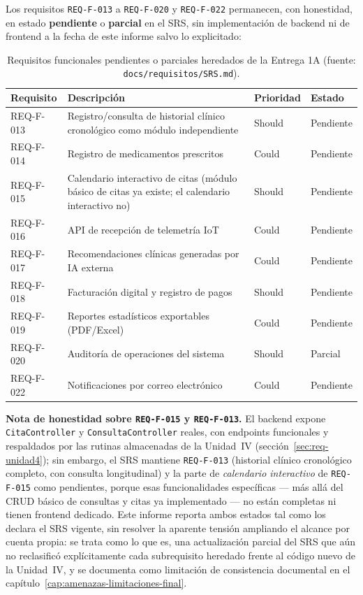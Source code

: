 Los requisitos \texttt{REQ-F-013} a \texttt{REQ-F-020} y \texttt{REQ-F-022}
permanecen, con honestidad, en estado \textbf{pendiente} o \textbf{parcial}
en el SRS, sin implementaci\'on de backend ni de frontend a la fecha de
este informe salvo lo explicitado:

\begin{table}[H]
  \centering
  \small
  \caption{Requisitos funcionales pendientes o parciales heredados de la Entrega 1A (fuente: \texttt{docs/requisitos/SRS.md}).}
  \label{tab:req-pendientes}
  \begin{tabular}{@{}p{2.0cm}p{6.4cm}p{1.6cm}p{2.0cm}@{}}
    \toprule
    Requisito & Descripci\'on & Prioridad & Estado \\
    \midrule
    REQ-F-013 & Registro/consulta de historial cl\'inico cronol\'ogico como m\'odulo independiente & Should & Pendiente \\
    REQ-F-014 & Registro de medicamentos prescritos & Could & Pendiente \\
    REQ-F-015 & Calendario interactivo de citas (m\'odulo b\'asico de citas ya existe; el calendario interactivo no) & Should & Pendiente \\
    REQ-F-016 & API de recepci\'on de telemetr\'ia IoT & Could & Pendiente \\
    REQ-F-017 & Recomendaciones cl\'inicas generadas por IA externa & Could & Pendiente \\
    REQ-F-018 & Facturaci\'on digital y registro de pagos & Should & Pendiente \\
    REQ-F-019 & Reportes estad\'isticos exportables (PDF/Excel) & Could & Pendiente \\
    REQ-F-020 & Auditor\'ia de operaciones del sistema & Should & Parcial \\
    REQ-F-022 & Notificaciones por correo electr\'onico & Could & Pendiente \\
    \bottomrule
  \end{tabular}
\end{table}

\textbf{Nota de honestidad sobre \texttt{REQ-F-015} y \texttt{REQ-F-013}.}
El backend expone \texttt{CitaController} y \texttt{ConsultaController}
reales, con endpoints funcionales y respaldados por las rutinas
almacenadas de la Unidad~IV (secci\'on~\ref{sec:req-unidad4}); sin embargo,
el SRS mantiene \texttt{REQ-F-013} (historial cl\'inico cronol\'ogico
completo, con consulta longitudinal) y la parte de \emph{calendario
interactivo} de \texttt{REQ-F-015} como pendientes, porque esas
funcionalidades espec\'ificas --- m\'as all\'a del CRUD b\'asico de
consultas y citas ya implementado --- no est\'an completas ni tienen
frontend dedicado. Este informe reporta ambos estados tal como los declara
el SRS vigente, sin resolver la aparente tensi\'on ampliando el alcance
por cuenta propia: se trata como lo que es, una actualizaci\'on parcial del
SRS que a\'un no reclasific\'o expl\'icitamente cada subrequisito heredado
frente al c\'odigo nuevo de la Unidad~IV, y se documenta como limitaci\'on
de consistencia documental en el cap\'itulo~\ref{cap:amenazas-limitaciones-final}.

